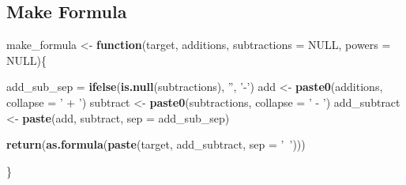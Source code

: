 \documentclass[]{book}
\newenvironment{Shaded}{\begin{snugshade}}{\end{snugshade}}
\newcommand{\KeywordTok}[1]{\textcolor[rgb]{0.13,0.29,0.53}{\textbf{#1}}}
\newcommand{\DataTypeTok}[1]{\textcolor[rgb]{0.13,0.29,0.53}{#1}}
\newcommand{\DecValTok}[1]{\textcolor[rgb]{0.00,0.00,0.81}{#1}}
\newcommand{\StringTok}[1]{\textcolor[rgb]{0.31,0.60,0.02}{#1}}
\newcommand{\OtherTok}[1]{\textcolor[rgb]{0.56,0.35,0.01}{#1}}
\newcommand{\ControlFlowTok}[1]{\textcolor[rgb]{0.13,0.29,0.53}{\textbf{#1}}}
\newcommand{\OperatorTok}[1]{\textcolor[rgb]{0.81,0.36,0.00}{\textbf{#1}}}
\newcommand{\NormalTok}[1]{#1}
\theoremstyle{definition}
\theoremstyle{definition}
\theoremstyle{definition}
\theoremstyle{remark}
\begin{document}
\begin{Shaded}
\end{Shaded}

\subsection{Make Formula}\label{make-formula}

\begin{Shaded}
\begin{Highlighting}[]
\NormalTok{make_formula <-}\StringTok{ }\ControlFlowTok{function}\NormalTok{(target, additions, }\DataTypeTok{subtractions =} \OtherTok{NULL}\NormalTok{, }\DataTypeTok{powers =} \OtherTok{NULL}\NormalTok{)\{}
  
\NormalTok{  add_sub_sep =}\StringTok{ }\KeywordTok{ifelse}\NormalTok{(}\KeywordTok{is.null}\NormalTok{(subtractions), }\StringTok{''}\NormalTok{, }\StringTok{'-'}\NormalTok{)}
\NormalTok{  add <-}\StringTok{ }\KeywordTok{paste0}\NormalTok{(additions, }\DataTypeTok{collapse =} \StringTok{' + '}\NormalTok{)}
\NormalTok{  subtract <-}\StringTok{ }\KeywordTok{paste0}\NormalTok{(subtractions, }\DataTypeTok{collapse =} \StringTok{' - '}\NormalTok{)}
\NormalTok{  add_subtract <-}\StringTok{ }\KeywordTok{paste}\NormalTok{(add, subtract, }\DataTypeTok{sep =}\NormalTok{ add_sub_sep)}
  
  \KeywordTok{return}\NormalTok{(}\KeywordTok{as.formula}\NormalTok{(}\KeywordTok{paste}\NormalTok{(target, add_subtract, }\DataTypeTok{sep =} \StringTok{'~'}\NormalTok{)))}
  
\NormalTok{\}}
\end{Highlighting}
\end{Shaded}
\end{document}
